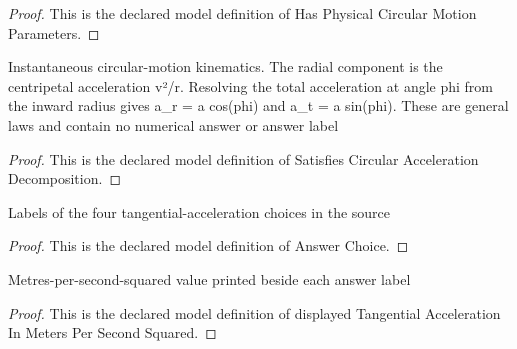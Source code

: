 \begin{proof}
  This is the declared model definition of Has Physical Circular Motion Parameters.
\end{proof}
\begin{definition}
  \label{def:physics:phyx-mini-0688:phyxminiproblems-problemphyxmini0688-satisfiescircularaccelerationdecomposition}
  Instantaneous circular-motion kinematics. The radial component is the centripetal acceleration v²/r. Resolving the total acceleration at angle phi from the inward radius gives a\_r = a cos(phi) and a\_t = a sin(phi). These are general laws and contain no numerical answer or answer label
\end{definition}
\begin{proof}
  This is the declared model definition of Satisfies Circular Acceleration Decomposition.
\end{proof}
\begin{definition}
  \label{def:physics:phyx-mini-0688:phyxminiproblems-problemphyxmini0688-answerchoice}
  Labels of the four tangential-acceleration choices in the source
\end{definition}
\begin{proof}
  This is the declared model definition of Answer Choice.
\end{proof}
\begin{definition}
  \label{def:physics:phyx-mini-0688:phyxminiproblems-problemphyxmini0688-displayedtangentialaccelerationinmeterspersecondsquared}
  Metres-per-second-squared value printed beside each answer label
\end{definition}
\begin{proof}
  This is the declared model definition of displayed Tangential Acceleration In Meters Per Second Squared.
\end{proof}
